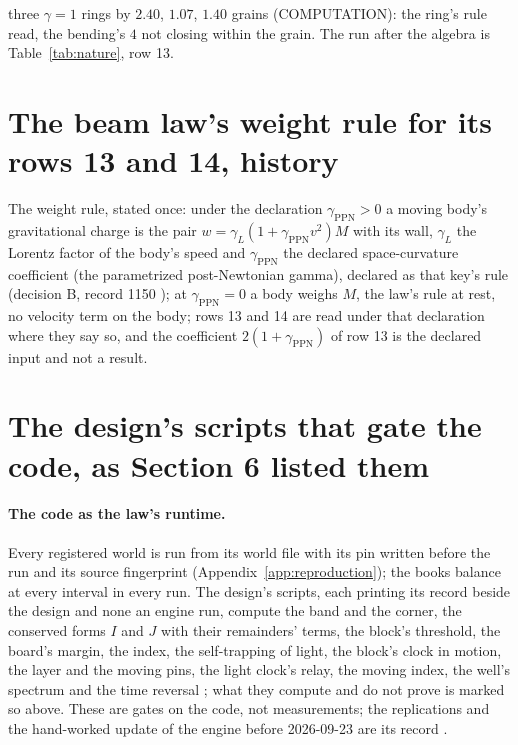 three $\gamma = 1$ rings by $2.40$, $1.07$, $1.40$ grains (COMPUTATION): the ring's rule read, the bending's $4$ not closing within the grain. The run after the algebra is Table~\ref{tab:nature}, row 13.



\section{The beam law's weight rule for its rows 13 and 14, history}\label{rec:weightrule}

The weight rule, stated once: under the declaration $\gamma_{\mathrm{PPN}} > 0$ a moving body's gravitational charge is the pair $w = \gamma_L(1 + \gamma_{\mathrm{PPN}}v^2)M$ with its wall, $\gamma_L$ the Lorentz factor of the body's speed and $\gamma_{\mathrm{PPN}}$ the declared space-curvature coefficient (the parametrized post-Newtonian gamma), declared as that key's rule (decision B, record 1150 \cite{log}); at $\gamma_{\mathrm{PPN}} = 0$ a body weighs $M$, the law's rule at rest, no velocity term on the body; rows 13 and 14 are read under that declaration where they say so, and the coefficient $2(1 + \gamma_{\mathrm{PPN}})$ of row 13 is the declared input and not a result. 

\section{The design's scripts that gate the code, as Section 6 listed them}\label{rec:coderuntime}

\paragraph{The code as the law's runtime.} Every registered world is run from its world file with its pin written before the run and its source fingerprint (Appendix~\ref{app:reproduction}); the books balance at every interval in every run. The design's scripts, each printing its record beside the design and none an engine run, compute the band and the corner, the conserved forms $I$ and $J$ with their remainders' terms, the block's threshold, the board's margin, the index, the self-trapping of light, the block's clock in motion, the layer and the moving pins, the light clock's relay, the moving index, the well's spectrum and the time reversal \cite[8.10]{algebra}; what they compute and do not prove is marked so above. These are gates on the code, not measurements; the replications and the hand-worked update of the engine before 2026-09-23 are its record \cite{records}.


